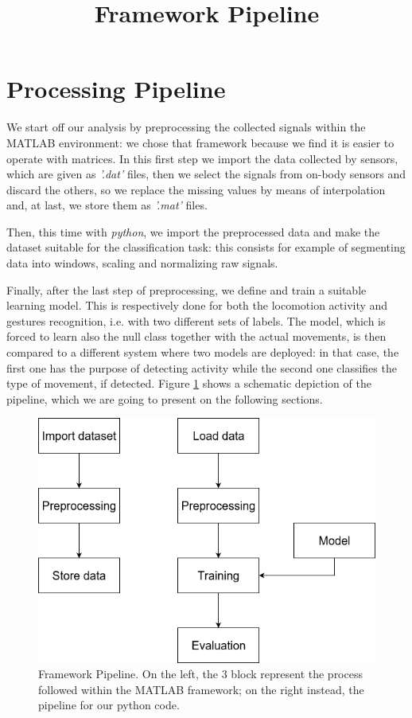 
\section{Processing Pipeline}
\label{sec:processing_architecture}

We start off our analysis by preprocessing the collected signals within the MATLAB environment: we chose that framework because we find it is easier to operate with matrices. In this first step we import the data collected by sensors, which are given as \textit{'.dat'} files, then we select the signals from on-body sensors and discard the others, so we replace the missing values by means of interpolation and, at last, we store them as \textit{'.mat'} files.

Then, this time with \textit{python}, we import the preprocessed data and make the dataset suitable for the classification task: this consists for example of segmenting data into windows, scaling and normalizing raw signals.

Finally, after the last step of preprocessing, we define and train a suitable learning model. This is respectively done for both the locomotion activity and gestures recognition, i.e. with two different sets of labels. The model, which is forced to learn also the null class together with the actual movements, is then compared to a different system where two models are deployed: in that case, the first one has the purpose of detecting activity while the second one classifies the type of movement, if detected. Figure \ref{fig:pipeline} shows a schematic depiction of the pipeline, which we are going to present on the following sections.

\begin{figure}[ht]
	\centering
	\includegraphics[scale=.4]{figure/block_diag}
	\title{Framework Pipeline}
	\caption{Framework Pipeline. On the left, the 3 block represent the process followed within the MATLAB framework; on the right instead, the pipeline for our python code.}
	\label{fig:pipeline}
\end{figure}

